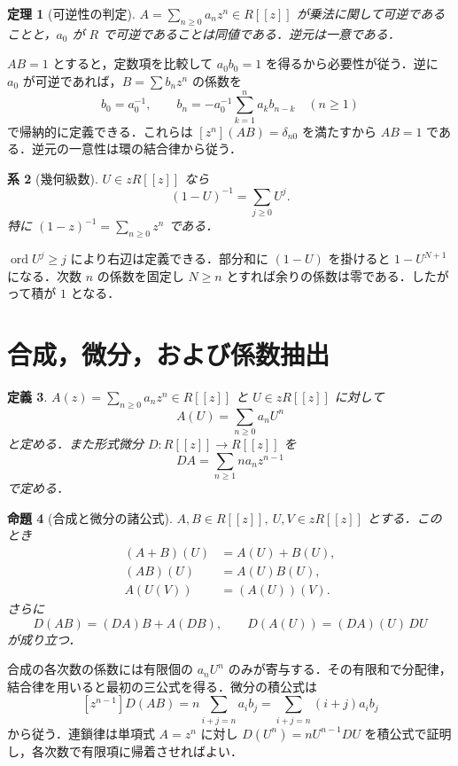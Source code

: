 \documentclass[a5paper,10pt,onecolumn]{jsarticle}
\makeatletter
\theoremstyle{mathnotetheorem}
\newtheorem{theorem}{定理}[section]
\newtheorem{definition}[theorem]{定義}
\newtheorem{proposition}[theorem]{命題}
\newtheorem{corollary}[theorem]{系}
\renewcommand{\proofname}{証明}
\renewenvironment{proof}[1][\proofname]{%
  \par\pushQED{\qed}\normalfont\topsep4\p@\@plus2\p@\relax
  \trivlist\item[\hskip\labelsep\bfseries #1]\ignorespaces
}{\popQED\endtrivlist\@endpefalse}
\makeatother
\begin{document}
\begin{theorem}[可逆性の判定]\label{thm:unit}
$A=\sum_{n\ge0}a_nz^n\in R[[z]]$ が乗法に関して可逆であることと，$a_0$ が $R$ で可逆であることは同値である．逆元は一意である．
\end{theorem}
\begin{proof}
$AB=1$ とすると，定数項を比較して $a_0b_0=1$ を得るから必要性が従う．逆に $a_0$ が可逆であれば，$B=\sum b_nz^n$ の係数を
\[
 b_0=a_0^{-1},\qquad
 b_n=-a_0^{-1}\sum_{k=1}^n a_kb_{n-k}\quad(n\ge1)
\]
で帰納的に定義できる．これらは $[z^n](AB)=\delta_{n0}$ を満たすから $AB=1$ である．逆元の一意性は環の結合律から従う．
\end{proof}

\begin{corollary}[幾何級数]\label{cor:geometric}
$U\in zR[[z]]$ なら
\[
 (1-U)^{-1}=\sum_{j\ge0}U^j.
\]
特に $(1-z)^{-1}=\sum_{n\ge0}z^n$ である．
\end{corollary}
\begin{proof}
$\operatorname{ord}U^j\ge j$ により右辺は定義できる．部分和に $(1-U)$ を掛けると $1-U^{N+1}$ になる．次数 $n$ の係数を固定し $N\ge n$ とすれば余りの係数は零である．したがって積が $1$ となる．
\end{proof}

\section{合成，微分，および係数抽出}
\begin{definition}
$A(z)=\sum_{n\ge0}a_nz^n\in R[[z]]$ と $U\in zR[[z]]$ に対して
\[
 A(U)=\sum_{n\ge0}a_nU^n
\]
と定める．また形式微分 $D:R[[z]]\to R[[z]]$ を
\[
 DA=\sum_{n\ge1}na_nz^{n-1}
\]
で定める．
\end{definition}
\begin{proposition}[合成と微分の諸公式]\label{prop:formalcalc}
$A,B\in R[[z]],\ U,V\in zR[[z]]$ とする．このとき
\begin{align*}
 (A+B)(U)&=A(U)+B(U),\\
 (AB)(U)&=A(U)B(U),\\
 A(U(V))&=(A(U))(V).
\end{align*}
さらに
\[
 D(AB)=(DA)B+A(DB),\qquad D(A(U))=(DA)(U)\,DU
\]
が成り立つ．
\end{proposition}
\begin{proof}
合成の各次数の係数には有限個の $a_nU^n$ のみが寄与する．その有限和で分配律，結合律を用いると最初の三公式を得る．微分の積公式は
\[
 [z^{n-1}]D(AB)=n\sum_{i+j=n}a_ib_j
 =\sum_{i+j=n}(i+j)a_ib_j
\]
から従う．連鎖律は単項式 $A=z^n$ に対し $D(U^n)=nU^{n-1}DU$ を積公式で証明し，各次数で有限項に帰着させればよい．
\end{proof}
\end{document}
